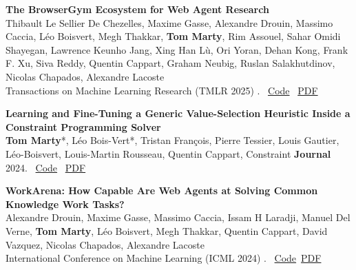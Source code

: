 \documentclass[letterpaper,11pt]{article}
\begin{document}
\begin{tcolorbox}[enhanced, rounded corners, colback=white, colframe=black!10!white, boxrule=0.5mm, left=10pt, right=10pt, top=6pt, bottom=3pt]
    \textbf{The BrowserGym Ecosystem for Web Agent Research} \\
    Thibault Le Sellier De Chezelles, Maxime Gasse, Alexandre Drouin, Massimo Caccia, Léo Boisvert, Megh Thakkar, \textbf{Tom Marty}, Rim Assouel, Sahar Omidi Shayegan, Lawrence Keunho Jang, Xing Han Lù, Ori Yoran, Dehan Kong, Frank F. Xu, Siva Reddy, Quentin Cappart, Graham Neubig, Ruslan Salakhutdinov, Nicolas Chapados, Alexandre Lacoste \\
        Transactions on Machine Learning Research (TMLR 2025) . \hfill  \faCode  \, \href{https://github.com/ServiceNow/BrowserGym}{Code} \quad
    \faFilePdf \, \href{https://arxiv.org/abs/2412.05467}{PDF}
\end{tcolorbox}

\begin{tcolorbox}[enhanced, rounded corners, colback=white, colframe=black!10!white, boxrule=0.5mm, left=10pt, right=10pt, top=6pt, bottom=3pt]
    \textbf{Learning and Fine-Tuning a Generic Value-Selection Heuristic Inside a Constraint Programming Solver} \\
    \textbf{Tom Marty}*, Léo Bois-Vert*, Tristan François, Pierre Tessier, Louis Gautier, Léo-Boisvert, Louis-Martin Rousseau, Quentin Cappart, Constraint \textbf{Journal} 2024.
 \hfill \faCode  \, \href{https://github.com/corail-research/SeaPearl.jl}{Code} \quad\faFilePdf \, \href{https://link.springer.com/article/10.1007/s10601-024-09377-4}{PDF}
\end{tcolorbox}

\begin{tcolorbox}[enhanced, rounded corners, colback=white, colframe=black!10!white, boxrule=0.5mm, left=10pt, right=10pt, top=6pt, bottom=3pt]
    \textbf{WorkArena: How Capable Are Web Agents at Solving Common Knowledge Work Tasks?} \\
    Alexandre Drouin, Maxime Gasse, Massimo Caccia, Issam H Laradji, Manuel Del Verne, \textbf{Tom Marty}, Léo Boisvert, Megh Thakkar, Quentin Cappart, David Vazquez, Nicolas Chapados, Alexandre Lacoste \\
    International Conference on Machine Learning (ICML 2024) .  \hfill
\faCode\, \href{https://github.com/ServiceNow/WorkArena}{Code}\quad \faFilePdf \, \href{https://servicenow.github.io/WorkArena/}{PDF}
\end{tcolorbox}
\end{document}
